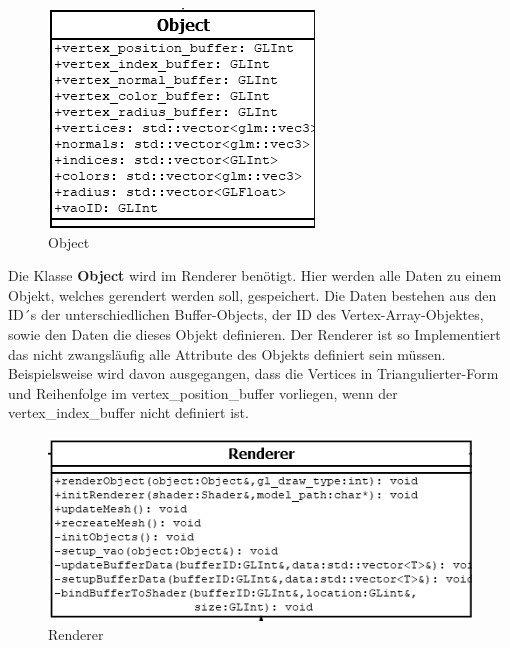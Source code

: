 	\begin{figure}[H]
	\centering
	\includegraphics[width=0.7\linewidth]{object.png}
	\caption{Object}
	\label{fig4}
	\end{figure}

\noindent Die Klasse \textbf{Object} wird im Renderer benötigt. Hier werden alle Daten zu einem Objekt, welches gerendert werden soll, gespeichert. Die Daten bestehen aus den ID´s der unterschiedlichen Buffer-Objects, der ID des Vertex-Array-Objektes, sowie den Daten die dieses Objekt definieren. Der Renderer ist so Implementiert das nicht zwangsläufig alle Attribute des Objekts definiert sein müssen. Beispielsweise wird davon ausgegangen, dass die Vertices in Triangulierter-Form und Reihenfolge im vertex\_position\_buffer vorliegen, wenn der vertex\_index\_buffer nicht definiert ist.

	\begin{figure}[H]
	\centering
	\includegraphics[width=0.7\linewidth]{renderer.png}
	\caption{Renderer}
	\label{fig5}
	\end{figure}

